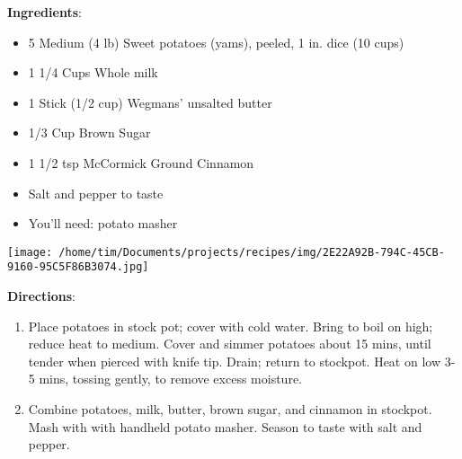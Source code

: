 \documentclass[11pt, twoside, openany]{book}
\begin{document}
\begin{minipage}[t]{0.8\linewidth}
\textbf{Ingredients}:\vspace{-3mm}
\begin{multicols}{2}
\begin{itemize}\setlength\itemsep{-1mm}
\item 5 Medium (4 lb) Sweet potatoes (yams), peeled, 1 in. dice (10 cups)
\item 1 1/4 Cups Whole milk
\item 1 Stick (1/2 cup) Wegmans' unsalted butter
\item 1/3 Cup Brown Sugar
\item 1 1/2 tsp McCormick Ground Cinnamon
\item Salt and pepper to taste
\item You'll need: potato masher
\end{itemize}
\end{multicols}
\end{minipage}
\begin{minipage}[t]{0.2\linewidth}
\centering \strut\vspace*{-\baselineskip}\newline
\texttt{[image: /home/tim/Documents/projects/recipes/img/2E22A92B-794C-45CB-9160-95C5F86B3074.jpg]}\\
\end{minipage}\vspace{3mm}
\textbf{Directions}:
\vspace{-3mm}\begin{enumerate}\setlength\itemsep{-1mm}
\item Place potatoes in stock pot; cover with cold water. Bring to boil on high; reduce heat to medium. Cover and simmer potatoes about 15 mins, until tender when pierced with knife tip. Drain; return to stockpot. Heat on low 3-5 mins, tossing gently, to remove excess moisture.
\item Combine potatoes, milk, butter, brown sugar, and cinnamon in stockpot. Mash with with handheld potato masher. Season to taste with salt and pepper. 
\end{enumerate}
 \label{hershey's-chocolate-cheesecake}\hfill\textit{}\\
\end{document}
